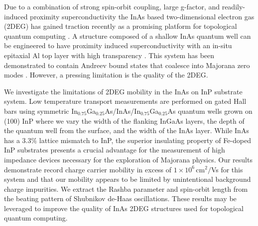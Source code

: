 \documentclass[
floatfix,
aps,
prl,
twocolumn,
superscriptaddress,
amssymb,
 groupaddress,
]{revtex4}
\begin{document}
\maketitle


Due to a combination of strong spin-orbit coupling, large g-factor, and readily-induced proximity superconductivity the InAs based two-dimensional electron gas (2DEG) has gained traction recently as a promising platform for topological quantum computing \citep{sarma:2005,alicea:2011,shabani:2016,kjaergaard:2016,kjaergaard:2017,suominen:2017,nichele:2017}.
A structure composed of a shallow InAs quantum well can be engineered to have proximity induced superconductivity with an in-situ epitaxial Al top layer with high transparency \citep{shabani:2016}.
This system has been demonstrated to contain Andreev bound states that coalesce into Majorana zero modes \citep{suominen:2017,nichele:2017}.
However, a pressing limitation is the quality of the 2DEG.




We investigate the limitations of 2DEG mobility in the InAs on InP substrate system.
Low temperature transport measurements are performed on gated Hall bars using symmetric In$_{0.75}$Ga$_{0.25}$As/InAs/In$_{0.75}$Ga$_{0.25}$As quantum wells grown on (100) InP where we vary the width of the flanking InGaAs layers, the depth of the quantum well from the surface, and the width of the InAs layer. 
While InAs has a 3.3$\%$ lattice mismatch to InP, the superior insulating property of Fe-doped InP substrates presents a crucial advantage for the measurement of high impedance devices necessary for the exploration of Majorana physics.
Our results demonstrate record charge carrier mobility in excess of $1 \times 10^{6}\,$cm$^{2}/$Vs for this system and that our mobility appears to be limited by unintentional background charge impurities.
We extract the Rashba parameter and spin-orbit length from the beating pattern of Shubnikov de-Haas oscillations.
These results may be leveraged to improve the quality of InAs 2DEG structures used for topological quantum computing.
\end{document}
